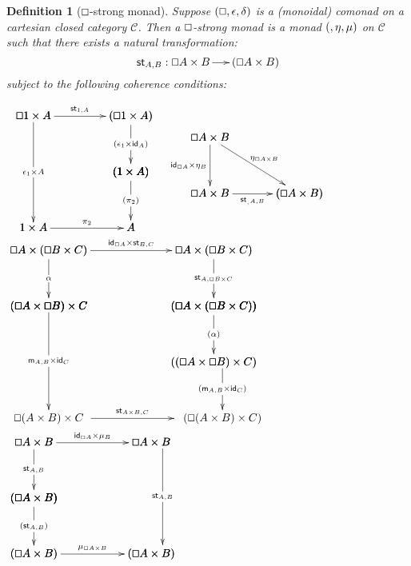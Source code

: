 \documentclass{article}
\let\Diamond\relax
\renewcommand{\Box}{\oblong}
\newcommand{\cat}[1]{\mathcal{#1}}
\newcommand{\pd}[0]{\times}
\newcommand{\st}[2]{\mathsf{st}_{#1,#2}}
\newcommand{\id}[0]{\mathsf{id}}
\newcommand{\m}[1]{\mathsf{m}_{#1}}
\newtheorem{definition}[theorem]{Definition}
\begin{document}
\begin{definition}[$\Box$-strong monad]
  \label{def:comonad-strong-monad}
  Suppose $(\Box, \epsilon, \delta)$ is a (monoidal) comonad on a
  cartesian closed category $\cat{C}$.  Then a \emph{$\Box$-strong
    monad} is a monad $(\Diamond,\eta,\mu)$ on $\cat{C}$ such that
  there exists a natural transformation:
  \[
  \st{A}{B} : \Box A \pd \Diamond B \to \Diamond(\Box A \pd B)
  \]
  subject to the following coherence conditions:
  \begin{center}
    \begin{math}      
      \begin{array}{lll}
        \bfig
      \vSquares|ammmmma|/>``>```>`>/[\Box 1 \times \Diamond A`\Diamond (\Box 1 \times A)``\Diamond(1 \times A)`1 \times \Diamond A`\Diamond A;\st{1}{A}``\Diamond(\epsilon_1 \times \id_A)```\Diamond(\pi_2)`\pi_2]
      \morphism(0,1000)|m|/->/<0,-950>[`;\epsilon_1 \times \Diamond A]
      \efig
      &
      \bfig
      \btriangle<800,500>[\Box A \pd B`\Box A \pd \Diamond B`\Diamond(\Box A \pd B);\id_{\Box A} \pd \eta_{B}`\eta_{\Box A \times B}`\st_{A,B}]
      \efig
      \end{array}      
    \end{math}
    \\
    \begin{math}
        \bfig
        \vSquares|ammmmmm|/->`->`->```->`/[
          \Box A \times (\Box B \times \Diamond C)`
          \Box A \times \Diamond(\Box B \times C)`
          (\Box A \times \Box B) \times \Diamond C`
          \Diamond(\Box A \times (\Box B \times C))``
          \Diamond((\Box A \times \Box B) \times C);
          \id_{\Box A} \pd \st{B}{C}`
          \alpha`
          \st{A}{\Box B \times C}```
          \Diamond(\alpha)`]
        \morphism(1554,0)|m|/->/<0,-500>[`\Diamond(\Box(A \times B) \times C);\Diamond(\m{A,B} \times \id_C)]
        
        \morphism(0,500)|m|/->/<0,-1000>[`\Box(A \times B) \times \Diamond C;\m{A,B} \times \id_{\Diamond C}]

        \morphism(350,-500)|a|/->/<800,0>[`;\st{A \times B}{C}]
        \efig
    \end{math}
    \\
    \begin{math}
      \bfig
      \vSquares|ammmmma|/->`->```->``->/[
        \Box A \times \Diamond\Diamond B`
        \Box A \times \Diamond B`
        \Diamond(\Box A \times \Diamond B)``
        \Diamond\Diamond(\Box A \times B)`
        \Diamond(\Box A \times B);
        \id_{\Box A} \pd \mu_{B}`
        \st{A}{\Diamond B}```
        \Diamond(\st{A}{B})``
        \mu_{\Box A \pd B}]
      \morphism(1150,1000)|m|<0,-920>[`;\st{A}{B}]
      \efig
    \end{math}
  \end{center}
\end{definition}
\end{document}
